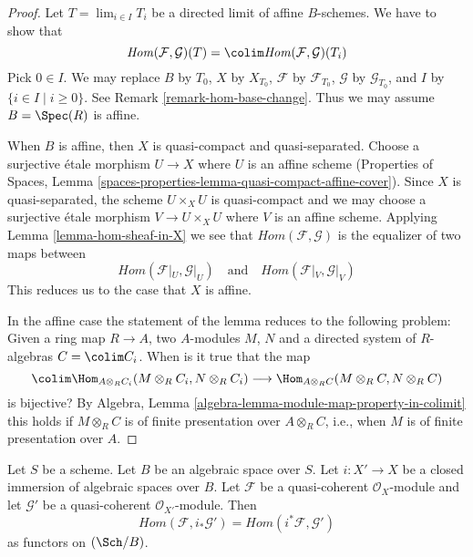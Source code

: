 \begin{proof}
Let $T = \lim_{i \in I} T_i$ be a directed limit of affine $B$-schemes.
We have to show that
$$
\mathit{Hom}(\mathcal{F}, \mathcal{G})(T) =
\colim \mathit{Hom}(\mathcal{F}, \mathcal{G})(T_i)
$$
Pick $0 \in I$. We may replace $B$ by $T_0$, $X$ by $X_{T_0}$,
$\mathcal{F}$ by $\mathcal{F}_{T_0}$, $\mathcal{G}$ by
$\mathcal{G}_{T_0}$, and $I$ by $\{i \in I \mid i \geq 0\}$.
See Remark \ref{remark-hom-base-change}.
Thus we may assume $B = \Spec(R)$ is affine.

\medskip\noindent
When $B$ is affine, then $X$ is quasi-compact and quasi-separated.
Choose a surjective \'etale morphism $U \to X$ where $U$ is an
affine scheme (Properties of Spaces, Lemma
\ref{spaces-properties-lemma-quasi-compact-affine-cover}).
Since $X$ is quasi-separated, the scheme $U \times_X U$ is quasi-compact
and we may choose a surjective \'etale morphism $V \to U \times_X U$
where $V$ is an affine scheme. Applying Lemma \ref{lemma-hom-sheaf-in-X}
we see that $\mathit{Hom}(\mathcal{F}, \mathcal{G})$ is the
equalizer of two maps between
$$
\mathit{Hom}(\mathcal{F}|_U, \mathcal{G}|_U)
\quad\text{and}\quad
\mathit{Hom}(\mathcal{F}|_V, \mathcal{G}|_V)
$$
This reduces us to the case that $X$ is affine.

\medskip\noindent
In the affine case the statement of the lemma reduces to
the following problem: Given a ring map $R \to A$, two $A$-modules
$M$, $N$ and a directed system of $R$-algebras $C = \colim C_i$.
When is it true that the map
$$
\colim \Hom_{A \otimes_R C_i}(M \otimes_R C_i, N \otimes_R C_i)
\longrightarrow
\Hom_{A \otimes_R C}(M \otimes_R C, N \otimes_R C)
$$
is bijective? By
Algebra, Lemma \ref{algebra-lemma-module-map-property-in-colimit}
this holds if $M \otimes_R C$ is of finite presentation over
$A \otimes_R C$, i.e., when $M$ is of finite presentation over $A$.
\end{proof}

\begin{lemma}
\label{lemma-hom-closed}
Let $S$ be a scheme. Let $B$ be an algebraic space over $S$.
Let $i : X' \to X$ be a closed immersion of algebraic spaces
over $B$. Let $\mathcal{F}$ be a quasi-coherent $\mathcal{O}_X$-module
and let $\mathcal{G}'$ be a quasi-coherent $\mathcal{O}_{X'}$-module.
Then
$$
\mathit{Hom}(\mathcal{F}, i_*\mathcal{G}') =
\mathit{Hom}(i^*\mathcal{F}, \mathcal{G}')
$$
as functors on $(\Sch/B)$.
\end{lemma}

